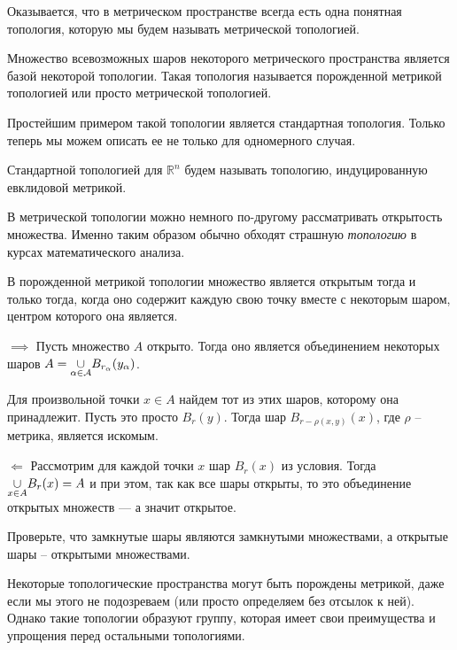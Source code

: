    Оказывается, что в метрическом пространстве всегда есть одна понятная топология, которую мы будем называть метрической топологией.

   \begin{Def}
       Множество всевозможных шаров некоторого метрического пространства является базой некоторой топологии. Такая топология называется порожденной метрикой топологией или просто метрической топологией.
   \end{Def}
   \begin{Ex}
       Простейшим примером такой топологии является стандартная топология. Только теперь мы можем описать ее не только для одномерного случая.

       Стандартной топологией для $\mathbb{R}^n$ будем называть топологию, индуцированную евклидовой метрикой.
   \end{Ex}

    В метрической топологии можно немного по-другому рассматривать открытость множества. Именно таким образом обычно обходят страшную \textit{топологию} в курсах математического анализа.

   \begin{Prop}
       В порожденной метрикой топологии множество является открытым тогда и только тогда, когда оно содержит каждую свою точку вместе с некоторым шаром, центром которого она является.
   \end{Prop}
   \begin{Proof}
       $\implies$ Пусть множество $A$ открыто. Тогда оно является объединением некоторых шаров  $A = \underset{\tiny \alpha\in\mathcal{A}}{\cup}B_{r_\alpha}(y_\alpha)$.   

       Для произвольной точки $x \in A$ найдем тот из этих шаров, которому она принадлежит. Пусть это просто $B_r(y)$. Тогда шар $B_{r-\rho(x,y)} (x)$, где $\rho$ -- метрика, является искомым.

       $\Longleftarrow$ Рассмотрим для каждой точки $x$ шар $B_r(x)$ из условия. Тогда $\underset{\tiny x\in A}{\cup}B_r(x) = A$ и при этом, так как все шары открыты, то это объединение открытых множеств --- а значит открытое.
   \end{Proof}

   \begin{Task}
       Проверьте, что замкнутые шары являются замкнутыми множествами, а открытые шары -- открытыми множествами.
   \end{Task}

   Некоторые топологические пространства могут быть порождены метрикой, даже если мы этого не подозреваем (или просто определяем без отсылок к ней). Однако такие топологии образуют группу, которая имеет свои преимущества и упрощения перед остальными топологиями.

